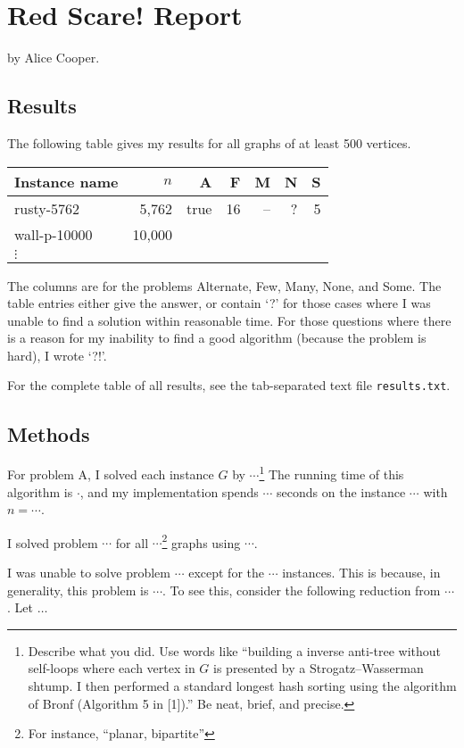 \documentclass{tufte-handout}
\begin{document}
\section{Red Scare! Report}

by Alice Cooper.

\subsection{Results}

The following table gives my results for all graphs of at least 500 vertices.

\medskip
\begin{tabular}{lrrrrrr}
  \toprule
  Instance name & $n$ & A & F & M & N & S \\
  \midrule
  rusty-5762 & 5,762 & true & 16 & -- & ? & 5 \\
  wall-p-10000 & 10,000 &\\	
  $\vdots$\\
  \bottomrule
\end{tabular}
\medskip

The columns are for the problems Alternate, Few, Many, None, and Some.
The table entries either give the answer, or contain `?' for those cases where I was unable to find a solution within reasonable time.
For those questions where there is a reason for my inability to find a good algorithm (because the problem is hard), I wrote `?!'.

For the complete table of all results, see the tab-separated text file {\tt results.txt}.

\subsection{Methods}

For problem A, I solved each instance $G$ by $\cdots$\footnote{Describe what you did.
  Use words like ``building a inverse anti-tree without self-loops where each vertex in $G$ is presented by a Strogatz--Wasserman shtump.
  I then performed a standard longest hash sorting using the algorithm of Bronf (Algorithm 5 in [1]).''
  Be neat, brief, and precise.}
The running time of this algorithm is $\cdot$, and my implementation spends $\cdots$ seconds on the instance $\cdots$ with  $n=\cdots$.

I solved problem $\cdots$ for all $\cdots$\footnote{For instance, “planar, bipartite”} graphs using $\cdots$.

I was unable to solve problem $\cdots$ except for the $\cdots$ instances.
This is because, in generality, this problem is $\cdots$. 
To see this, consider the following reduction from $\cdots$.
Let $\ldots$ 
\end{document}

